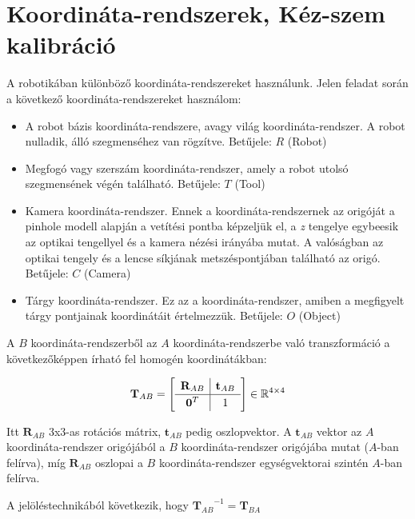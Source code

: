 \chapter{Koordináta-rendszerek, Kéz-szem kalibráció}

A robotikában különböző koordináta-rendszereket használunk. Jelen feladat során a következő koordináta-rendszereket használom:
	\begin{itemize}
	\item A robot bázis koordináta-rendszere, avagy világ koordináta-rendszer. A robot nulladik, álló szegmenséhez van rögzítve. Betűjele: $R$ (Robot)	
	\item Megfogó vagy szerszám koordináta-rendszer, amely a robot utolsó szegmensének végén található. Betűjele: $T$ (Tool)
	\item Kamera koordináta-rendszer. Ennek a koordináta-rendszernek az origóját a pinhole modell alapján a vetítési pontba képzeljük el, a \textit{z} tengelye egybeesik az optikai tengellyel és a kamera nézési irányába mutat. A valóságban az optikai tengely és a lencse síkjának metszéspontjában található az origó. Betűjele: $C$ (Camera)
	\item Tárgy koordináta-rendszer. Ez az a koordináta-rendszer, amiben a megfigyelt tárgy pontjainak koordinátáit értelmezzük. Betűjele: $O$ (Object)
	\end{itemize}
	
	A $B$ koordináta-rendszerből az $A$ koordináta-rendszerbe való transzformáció a következőképpen írható fel homogén koordinátákban:
	
	\begin{equation}
	\label{eq:trf-kifejt}
	\mathbf{T}_{AB} = 
	\left[
	\def\arraystretch{1.2}
	\begin{array}{c|c}
 	\mathbf{R}_{AB} & \mathbf{t}_{AB} \\
 	\hline
	\mathbf{0}^T & 1 \\
	\end{array}	
	\right] \in \mathbb{R}^{4 \times 4}
	\end{equation}
	
	Itt $\mathbf{R}_{AB}$ 3x3-as rotációs mátrix, $\mathbf{t}_{AB}$ pedig oszlopvektor. A $\mathbf{t}_{AB}$ vektor az $A$ koordináta-rendszer origójából a $B$ koordináta-rendszer origójába mutat ($A$-ban felírva), míg $\mathbf{R}_{AB}$ oszlopai a $B$ koordináta-rendszer egységvektorai szintén $A$-ban felírva.
	
	A jelöléstechnikából következik, hogy ${\mathbf{T}_{AB}}^{-1} = \mathbf{T}_{BA}$

